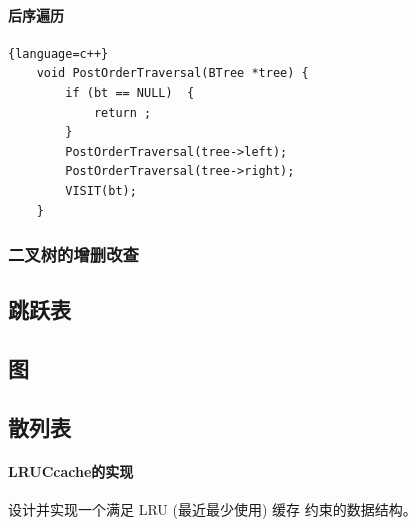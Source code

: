 \paragraph{后序遍历}
\begin{lstlisting}{language=c++}
	void PostOrderTraversal(BTree *tree) {
		if (bt == NULL)  {
			return ; 
		}
		PostOrderTraversal(tree->left); 
		PostOrderTraversal(tree->right); 
		VISIT(bt);
	}
\end{lstlisting}
\subsubsection{二叉树的增删改查}

\subsection{跳跃表}
\subsection{图}
\subsection{散列表}
\paragraph{LRUCcache的实现} 
设计并实现一个满足  LRU (最近最少使用) 缓存 约束的数据结构。
